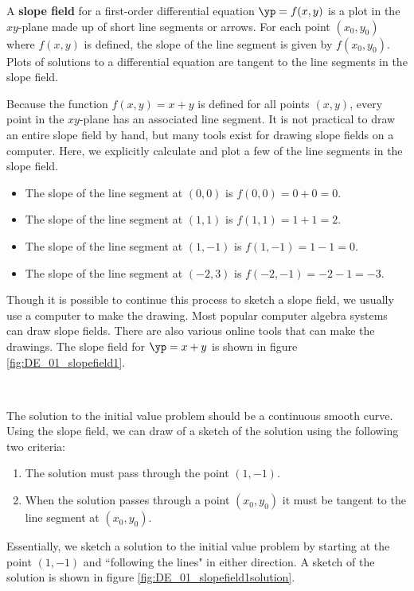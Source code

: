 {A \textbf{slope field} for a first-order differential equation $\yp = f(x,y)$ is a plot in the $xy$-plane made up of short line segments or arrows. For each point $(x_0,y_0)$ where $f(x,y)$ is defined, the slope of the line segment is given by $f(x_0,y_0)$. Plots of solutions to a differential equation are tangent to the line segments in the slope field.}\\

{Because the function $f(x,y) = x+y$ is defined for all points $(x,y)$, every point in the $xy$-plane has an associated line segment. It is not practical to draw an entire slope field by hand, but many tools exist for drawing slope fields on a computer.  Here, we explicitly calculate and plot a few of the line segments in the slope field.

\begin{itemize}
\item The slope of the line segment at $(0,0)$ is $f(0,0) = 0 + 0 = 0.$
\item The slope of the line segment at $(1,1)$ is $f(1,1) = 1 + 1 = 2.$
\item The slope of the line segment at $(1,-1)$ is $f(1,-1) = 1 - 1 = 0.$
\item The slope of the line segment at $(-2,3)$ is $f(-2,-1) = -2 - 1 = -3.$
\end{itemize}

Though it is possible to continue this process to sketch a slope field, we usually use a computer to make the drawing.  Most popular computer algebra systems can draw slope fields.  There are also various online tools that can make the drawings.  The slope field for $\yp = x+y$ is shown in figure \ref{fig:DE_01_slopefield1}.
}\\


{The solution to the initial value problem should be a continuous smooth curve.  Using the slope field, we can draw of a sketch of the solution using the following two criteria:

\begin{enumerate}
\item The solution must pass through the point $(1,-1)$.
\item When the solution passes through a point $(x_0,y_0)$ it must be tangent to the line segment at $(x_0,y_0)$.
\end{enumerate}
Essentially, we sketch a solution to the initial value problem by starting at the point $(1,-1)$ and ``following the lines" in either direction.  A sketch of the solution is shown in figure \ref{fig:DE_01_slopefield1solution}.
}\\

